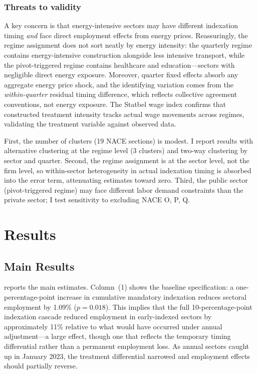 \documentclass[12pt]{article}
\begin{document}
\subsubsection*{Threats to validity} A key concern is that energy-intensive sectors may have different indexation timing \textit{and} face direct employment effects from energy prices. Reassuringly, the regime assignment does not sort neatly by energy intensity: the quarterly regime contains energy-intensive construction alongside less intensive transport, while the pivot-triggered regime contains healthcare and education---sectors with negligible direct energy exposure. Moreover, quarter fixed effects absorb any aggregate energy price shock, and the identifying variation comes from the \textit{within-quarter} residual timing difference, which reflects collective agreement conventions, not energy exposure. The Statbel wage index confirms that constructed treatment intensity tracks actual wage movements across regimes, validating the treatment variable against observed data.

First, the number of clusters (19 NACE sections) is modest. I report results with alternative clustering at the regime level (3 clusters) and two-way clustering by sector and quarter. Second, the regime assignment is at the sector level, not the firm level, so within-sector heterogeneity in actual indexation timing is absorbed into the error term, attenuating estimates toward zero. Third, the public sector (pivot-triggered regime) may face different labor demand constraints than the private sector; I test sensitivity to excluding NACE O, P, Q.


\section{Results}

\subsection{Main Results}

 reports the main estimates. Column~(1) shows the baseline specification: a one-percentage-point increase in cumulative mandatory indexation reduces sectoral employment by 1.09\% ($p = 0.018$). This implies that the full 10-percentage-point indexation cascade reduced employment in early-indexed sectors by approximately 11\% relative to what would have occurred under annual adjustment---a large effect, though one that reflects the temporary timing differential rather than a permanent employment loss. As annual sectors caught up in January 2023, the treatment differential narrowed and employment effects should partially reverse.
\end{document}
